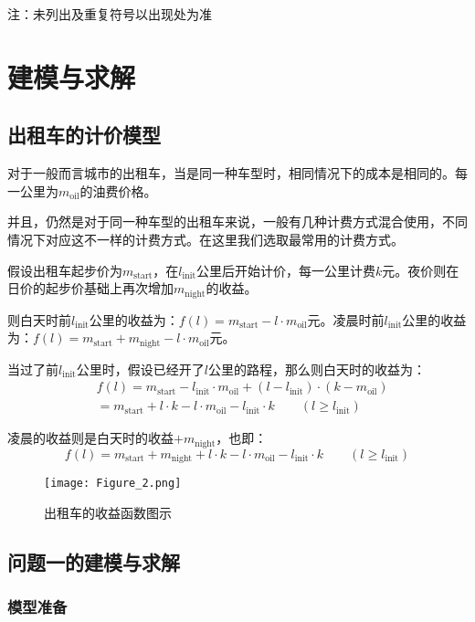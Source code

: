 \documentclass{cumcmthesis}
\begin{document}
注：未列出及重复符号以出现处为准

\newpage
\section{建模与求解}
\subsection{出租车的计价模型}
对于一般而言城市的出租车，当是同一种车型时，相同情况下的成本是相同的。每一公里为$m_{\mathrm{oil}}$的油费价格。\par
并且，仍然是对于同一种车型的出租车来说，一般有几种计费方式混合使用，不同情况下对应这不一样的计费方式。在这里我们选取最常用的计费方式。\par
假设出租车起步价为$m_{\mathrm{start}}$，在$l_{\mathrm{init}}$公里后开始计价，每一公里计费$k$元。夜价则在日价的起步价基础上再次增加$m_{\mathrm{night}}$的收益。\par
则白天时前$l_{\mathrm{init}}$公里的收益为：$f(l)=m_{\mathrm{start}}-l\cdot m_{\mathrm{oil}}$元。凌晨时前$l_{\mathrm{init}}$公里的收益为：$f(l)=m_{\mathrm{start}}+m_{\mathrm{night}}-l\cdot m_{\mathrm{oil}}$元。\par
当过了前$l_{\mathrm{init}}$公里时，假设已经开了$l$公里的路程，那么则白天时的收益为：
$$
	\begin{array}{lcl}
		 & f(l) = m_{\mathrm{start}}-l_{\mathrm{init}}\cdot m_{\mathrm{oil}}+(l-l_{\mathrm{init}})\cdot (k-m_{\mathrm{oil}}) \\
		 & = m_{\mathrm{start}}+l\cdot k-l\cdot m_{\mathrm{oil}}-l_{\mathrm{init}}\cdot k
		\quad\quad (l\ge l_{\mathrm{init}})
	\end{array}
$$\par
凌晨的收益则是白天时的收益$+m_{\mathrm{night}}$，也即：
$$
	f(l)=m_{\mathrm{start}}+m_{\mathrm{night}}+l\cdot k-l\cdot m_{\mathrm{oil}}-l_{\mathrm{init}}\cdot k
	\quad\quad (l\ge l_{\mathrm{init}})
$$
\begin{figure}[!h]
	\centering
	\texttt{[image: Figure\_2.png]}
	\caption{出租车的收益函数图示}
\end{figure}

\subsection{问题一的建模与求解}
\subsubsection{模型准备}
\end{document}
